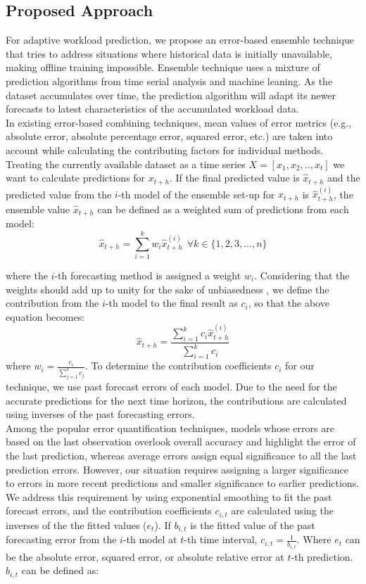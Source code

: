 \subsection{Proposed Approach}

For adaptive workload prediction, we propose an error-based ensemble technique that tries to address situations where historical data is initially unavailable, making offline training impossible. Ensemble technique uses a mixture of prediction algorithms from time serial analysis and machine leaning. As the dataset accumulates over time, the prediction algorithm will adapt its newer forecasts to latest characteristics of the accumulated workload data.\\

In existing error-based combining techniques, mean values of error metrics (e.g., absolute error, absolute percentage error, squared error, etc.) are taken into account while calculating the contributing factors for individual methods. 
Treating the currently available dataset as a time series
$X=[x_{1},x_{2},.. , x_{t}]$
we want to calculate predictions for $x_{t+h}$. If the final predicted value is $\hat{x}_{t+h}$ and the predicted value from the $i$-th model of the ensemble set-up for $x_{t+h}$ is $\hat{x}_{t+h}^{(i)}$, the ensemble value $\hat{x}_{t+h}$ can be defined as a weighted sum of predictions from each model:
\begin{equation}
\hat{x}_{t+h}= \sum_{i=1}^{k}w_i \hat{x}_{t+h}^{(i)} \ \ \forall k \in \{1,2,3,...,n\}
\end{equation}

where the $i$-th forecasting method is assigned a weight $w_i$. Considering that the weights should add up to unity for the sake of unbiasedness \cite{Adhikari_2012}, we define the contribution from the $i$-th model to the final result as $c_i$, so that the above equation becomes:
\begin{equation}
\hat{x}_{t+h}= \frac{\sum_{i=1}^{k}c_i \hat{x}_{t+h}^{(i)}}{\sum_{i=1}^{k}c_i}
\end{equation}
where $w_{i}= \frac{c_{i}}{\sum_{j=1}^{k}c_j}$.
To determine the contribution coefficients $c_i$ for our technique, we use past forecast errors of each model. Due to the need for the accurate predictions for the next time horizon, the contributions are calculated using inverses of the past forecasting errors.\\
Among the popular error quantification techniques, models whose errors are based on the last observation overlook overall accuracy and highlight the error of the last prediction, whereas  average errors assign equal significance to all the last prediction errors. However, our situation requires assigning a larger significance to errors in more recent predictions and smaller significance to earlier predictions. We address this requirement by using exponential smoothing to fit the past forecast errors, and the contribution coefficients $c_{i,t}$ are calculated using the inverses of the the fitted values ($e_{t}$). If $b_{i,t}$ is the fitted value of the past forecasting error from the $i$-th model at $t$-th time interval, $c_{i,t}=\frac{1}{b_{i,t}}$. Where $e_{t}$ can be the absolute error, squared error, or absolute relative error at $t$-th prediction. $b_{i,t}$ can be defined as:

